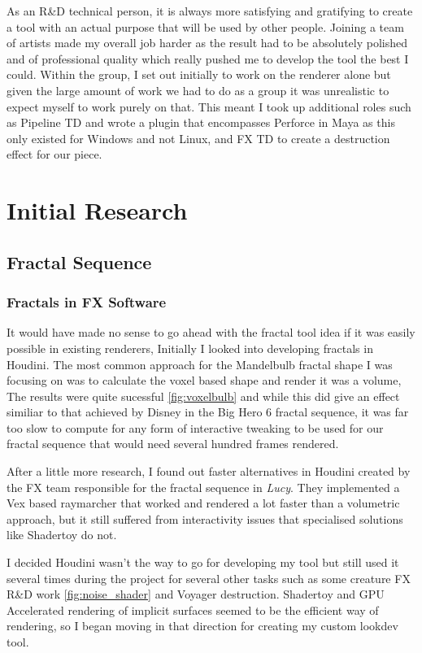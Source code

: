 \documentclass[11pt,a4paper,final,notitlepage]{report}
\begin{document}
As an R\&D technical person, it is always more satisfying and gratifying to create a tool with an actual purpose that will be used by other people. Joining a team of artists made my overall job harder as the result had to be absolutely polished and of professional quality which really pushed me to develop the tool the best I could. Within the group, I set out initially to work on the renderer alone but given the large amount of work we had to do as a group it was unrealistic to expect myself to work purely on that. This meant I took up additional roles such as Pipeline TD and wrote a plugin that encompasses Perforce in Maya as this only existed for Windows and not Linux, and FX TD to create a destruction effect for our piece.

\chapter{Initial Research}

\section{Fractal Sequence}
\subsection{Fractals in FX Software}

It would have made no sense to go ahead with the fractal tool idea if it was easily possible in existing renderers, Initially I looked into developing fractals in Houdini. The most common approach for the Mandelbulb  fractal shape I was focusing on was to calculate the voxel based shape and render it was a volume, The results were quite sucessful \ref{fig:voxelbulb} and while this did give an effect similiar to that achieved by Disney in the Big Hero 6 \cite{bh6} fractal sequence, it was far too slow to compute for any form of interactive tweaking to be used for our fractal sequence that would need several hundred frames rendered. 

After a little more research, I found out faster alternatives in Houdini created by the FX team responsible for the fractal sequence in \textit{Lucy}. They implemented a Vex based raymarcher \cite{Kim:2014:CIU:2614106.2614166} that worked and rendered a lot  faster than a volumetric approach, but it still suffered from interactivity issues that specialised solutions like Shadertoy do not. 

I decided Houdini wasn't the way to go for developing my tool but still used it several times during the project for several other tasks such as some creature FX R\&D work  \ref{fig:noise_shader} and Voyager destruction. Shadertoy and GPU Accelerated rendering of implicit surfaces seemed to be the efficient way of rendering, so I began moving in that direction for creating my custom lookdev tool.
\end{document}
